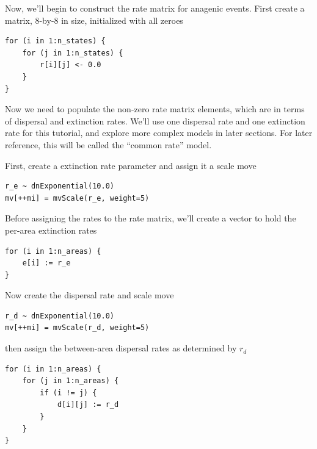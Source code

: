 Now, we'll begin to construct the rate matrix for anagenic events. First create a matrix, 8-by-8 in size, initialized with all zeroes

\begin{snugshade}
\begin{lstlisting}
for (i in 1:n_states) {
    for (j in 1:n_states) {
        r[i][j] <- 0.0
    }
}
\end{lstlisting}
\end{snugshade}

Now we need to populate the non-zero rate matrix elements, which are in terms of dispersal and extinction rates.
We'll use one dispersal rate and one extinction rate for this tutorial, and explore more complex models in later sections.
For later reference, this will be called the ``common rate'' model.

First, create a extinction rate parameter and assign it a scale move

\begin{snugshade}
\begin{lstlisting}
r_e ~ dnExponential(10.0)
mv[++mi] = mvScale(r_e, weight=5)
\end{lstlisting}
\end{snugshade}

Before assigning the rates to the rate matrix, we'll create a vector to hold the per-area extinction rates 

\begin{snugshade}
\begin{lstlisting}
for (i in 1:n_areas) {
    e[i] := r_e
}
\end{lstlisting}
\end{snugshade}

Now create the dispersal rate and scale move

\begin{snugshade}
\begin{lstlisting}
r_d ~ dnExponential(10.0)
mv[++mi] = mvScale(r_d, weight=5)
\end{lstlisting}
\end{snugshade}

then assign the between-area dispersal rates as determined by {\tt $r_d$}

\begin{snugshade}
\begin{lstlisting}
for (i in 1:n_areas) {
    for (j in 1:n_areas) {
        if (i != j) {
            d[i][j] := r_d
        }
    }
}
\end{lstlisting}
\end{snugshade}


